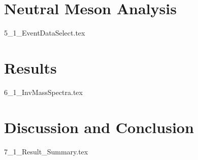 \documentclass[numbered,pdftex]{ohio-etd}
\begin{document}
\chapter {Neutral Meson Analysis}
{5_1_EventDataSelect.tex}


\chapter{Results}
{6_1_InvMassSpectra.tex}


\chapter{Discussion and Conclusion}
{7_1_Result_Summary.tex}




\appendix  %




\end{document}
